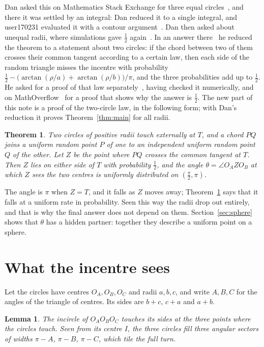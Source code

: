 \documentclass[11pt]{article}
\newtheorem{theorem}{Theorem}
\newtheorem{lemma}{Lemma}
\theoremstyle{remark}
\begin{document}
Dan asked this on Mathematics Stack Exchange for three equal circles~\cite{DanEqual}, and
there it was settled by an integral: Dan reduced it to a single integral, and user170231
evaluated it with a contour argument~\cite{user170231}. Dan then asked about unequal radii, where simulations gave $\frac12$ again~\cite{DanAny}. In
an answer there~\cite{DanReduction} he reduced the theorem to a statement about two circles: if
the chord between two of them crosses their common tangent according to a certain law, then each
side of the random triangle misses the incentre with probability
$\frac12-\bigl(\arctan(\rho/a)+\arctan(\rho/b)\bigr)/\pi$, and the three probabilities add up to
$\frac12$. He asked for a proof of that law separately~\cite{DanLemma}, having checked it
numerically, and on MathOverflow~\cite{DanMO} for a proof that shows why the answer is
$\frac12$. The new part of this note is a proof of the two-circle law, in the following form;
with Dan's reduction it proves Theorem~\ref{thm:main} for all radii.

\begin{theorem}\label{thm:angle}
Two circles of positive radii touch externally at $T$, and a chord $PQ$ joins a uniform random point $P$ of one to an
independent uniform random point $Q$ of the other. Let $Z$ be the point where $PQ$ crosses the
common tangent at $T$. Then $Z$ lies on either side of $T$ with probability $\frac12$, and the
angle $\theta=\angle O_AZO_B$ at which $Z$ sees the two centres is uniformly distributed on
$(\frac\pi2,\pi)$.
\end{theorem}

The angle is $\pi$ when $Z=T$, and it falls as $Z$ moves away; Theorem~\ref{thm:angle} says
that it falls at a uniform rate in probability. Seen this way the radii drop out entirely, and
that is why the final answer does not depend on them. Section~\ref{sec:sphere} shows that $\theta$
has a hidden partner: together they describe a uniform point on a sphere.

\section{What the incentre sees}

Let the circles have centres $O_A,O_B,O_C$ and radii $a,b,c$, and write $A,B,C$ for the angles of
the triangle of centres. Its sides are $b+c$, $c+a$ and $a+b$.

\begin{lemma}\label{lem:sectors}
The incircle of $O_AO_BO_C$ touches its sides at the three points where the circles touch.
Seen from its centre $I$, the three circles fill three angular sectors of widths $\pi-A$,
$\pi-B$, $\pi-C$, which tile the full turn.
\end{lemma}
\end{document}

